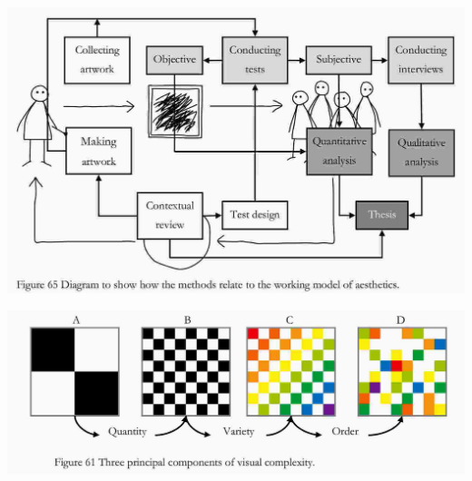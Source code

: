 \documentclass[letter]{article}
\begin{document}
\includegraphics[width=\columnwidth]{./figures/aesthetic-research.jpg}

\includegraphics[width=\columnwidth]{./figures/quantity-variety-order.jpg}


%
%



\end{document}
